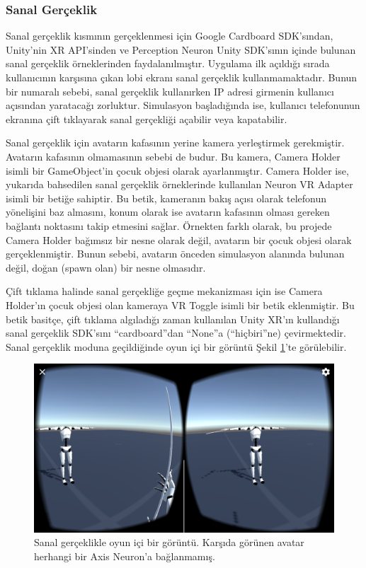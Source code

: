 \documentclass[a4paper, 12pt, titlepage]{article}
\begin{document}
\subsubsection{Sanal Gerçeklik}

Sanal gerçeklik kısmının gerçeklenmesi için Google Cardboard SDK’sından, Unity’nin XR API’sinden ve
Perception Neuron Unity SDK’sının içinde bulunan sanal gerçeklik örneklerinden faydalanılmıştır.
Uygulama ilk açıldığı sırada kullanıcının karşısına çıkan lobi ekranı sanal gerçeklik
kullanmamaktadır. Bunun bir numaralı sebebi, sanal gerçeklik kullanırken IP adresi girmenin
kullanıcı açısından yaratacağı zorluktur. Simulasyon başladığında ise, kullanıcı telefonunun
ekranına çift tıklayarak sanal gerçekliği açabilir veya kapatabilir.

Sanal gerçeklik için avatarın kafasının yerine kamera yerleştirmek gerekmiştir. Avatarın kafasının
olmamasının sebebi de budur. Bu kamera, Camera Holder isimli bir GameObject’in çocuk objesi olarak
ayarlanmıştır. Camera Holder ise, yukarıda bahsedilen sanal gerçeklik örneklerinde kullanılan
Neuron VR Adapter isimli bir betiğe sahiptir. Bu betik, kameranın bakış açısı olarak telefonun
yönelişini baz almasını, konum olarak ise avatarın kafasının olması gereken bağlantı noktasını
takip etmesini sağlar. Örnekten farklı olarak, bu projede Camera Holder bağımsız bir nesne olarak
değil, avatarın bir çocuk objesi olarak gerçeklenmiştir. Bunun sebebi, avatarın önceden simulasyon
alanında bulunan değil, doğan (spawn olan) bir nesne olmasıdır.

Çift tıklama halinde sanal gerçekliğe geçme mekanizması için ise Camera Holder’ın çocuk objesi olan
kameraya VR Toggle isimli bir betik eklenmiştir. Bu betik basitçe, çift tıklama algıladığı zaman
kullanılan Unity XR’ın kullandığı sanal gerçeklik SDK’sını “cardboard”dan “None”a (“hiçbiri”ne)
çevirmektedir. Sanal gerçeklik moduna geçildiğinde oyun içi bir görüntü Şekil \ref{vr}’te
görülebilir.

\begin{figure}[hbt!]
    \centering
        \includegraphics[width=6in]{images/vr}
    \caption{Sanal gerçeklikle oyun içi bir görüntü. Karşıda görünen avatar herhangi bir Axis        
             Neuron'a bağlanmamış.}
    \label{vr}
\end{figure}
\end{document}
